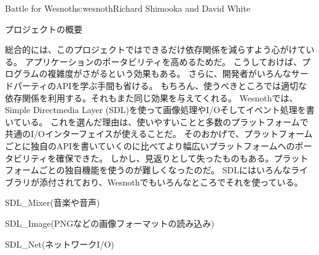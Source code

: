\begin{aosachapter}{Battle for Wesnoth}{s:wesnoth}{Richard Shimooka and David White}
\begin{aosasect1}{プロジェクトの概要}

総合的には、このプロジェクトではできるだけ依存関係を減らすよう心がけている。
アプリケーションのポータビリティを高めるためだ。
こうしておけば、プログラムの複雑度がさがるという効果もある。
さらに、開発者がいろんなサードパーティのAPIを学ぶ手間も省ける。
もちろん、使うべきところでは適切な依存関係を利用する。それもまた同じ効果を与えてくれる。
Wesnothでは、Simple Directmedia Layer (SDL)を使って画像処理やI/Oそしてイベント処理を書いている。
これを選んだ理由は、使いやすいことと多数のプラットフォームで共通のI/Oインターフェイスが使えることだ。
そのおかげで、プラットフォームごとに独自のAPIを書いていくのに比べてより幅広いプラットフォームへのポータビリティを確保できた。
しかし、見返りとして失ったものもある。プラットフォームごとの独自機能を使うのが難しくなったのだ。
SDLにはいろんなライブラリが添付されており、Wesnothでもいろんなところでそれを使っている。

\begin{aosaitemize}

  \item SDL\_Mixer(音楽や音声)

  \item SDL\_Image(PNGなどの画像フォーマットの読み込み)

  \item SDL\_Net(ネットワークI/O)


\end{aosaitemize}
\end{aosasect1}
\end{aosachapter}
